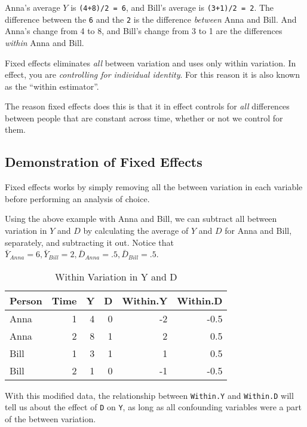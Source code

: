 \documentclass[]{book}
\theoremstyle{definition}
\theoremstyle{definition}
\theoremstyle{definition}
\theoremstyle{remark}
\begin{document}
Anna's average \(Y\) is \texttt{(4+8)/2\ =\ 6}, and Bill's average is
\texttt{(3+1)/2\ =\ 2}. The difference between the \texttt{6} and the
\texttt{2} is the difference \emph{between} Anna and Bill. And Anna's
change from 4 to 8, and Bill's change from 3 to 1 are the differences
\emph{within} Anna and Bill.

Fixed effects eliminates \emph{all} between variation and uses only
within variation. In effect, you are \emph{controlling for individual
identity}. For this reason it is also known as the ``within estimator''.

The reason fixed effects does this is that it in effect controls for
\emph{all} differences between people that are constant across time,
whether or not we control for them.

\subsection{Demonstration of Fixed
Effects}\label{demonstration-of-fixed-effects}

Fixed effects works by simply removing all the between variation in each
variable before performing an analysis of choice.

Using the above example with Anna and Bill, we can subtract all between
variation in \(Y\) and \(D\) by calculating the average of \(Y\) and
\(D\) for Anna and Bill, separately, and subtracting it out. Notice that
\(\bar{Y}_{Anna}=6, \bar{Y}_{Bill}=2, \bar{D}_{Anna}=.5, \bar{D}_{Bill}=.5\).

\begin{table}[t]

\caption{\label{tab:unnamed-chunk-12}Within Variation in Y and D}
\centering
\begin{tabular}{l|r|r|r|r|r}
\hline
Person & Time & Y & D & Within.Y & Within.D\\
\hline
Anna & 1 & 4 & 0 & -2 & -0.5\\
\hline
Anna & 2 & 8 & 1 & 2 & 0.5\\
\hline
Bill & 1 & 3 & 1 & 1 & 0.5\\
\hline
Bill & 2 & 1 & 0 & -1 & -0.5\\
\hline
\end{tabular}
\end{table}

With this modified data, the relationship between \texttt{Within.Y} and
\texttt{Within.D} will tell us about the effect of \texttt{D} on
\texttt{Y}, as long as all confounding variables were a part of the
between variation.
\end{document}

